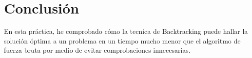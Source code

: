\documentclass[a4]{article}
\begin{document}
\begin{figure}[H]
  \centering
\end{figure}

\section{Conclusión}

En esta práctica, he comprobado cómo la tecnica de Backtracking puede
hallar la solución óptima a un problema en un tiempo mucho menor que
el algoritmo de fuerza bruta por medio de evitar comprobaciones
innecesarias.
\end{document}
